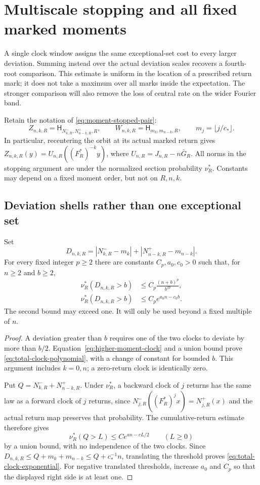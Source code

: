 \section{Multiscale stopping and all fixed marked moments}
\label{sec:multiscale-stopping}
A single clock window assigns the same exceptional-set cost to every
larger deviation. Summing instead over the actual deviation scales
recovers a fourth-root comparison. This estimate is uniform in the
location of a prescribed return mark; it does not take a maximum over
all marks inside the expectation. The stronger comparison will also
remove the loss of central rate on the wider Fourier band.

Retain the notation of \eqref{eq:moment-stopped-pair}:
\[
 Z_{n,k,R}=\mathsf H_{N^-_{k,R},N^+_{n-k,R},R},\qquad
 W_{n,k,R}=\mathsf H_{m_k,m_{n-k},R},\qquad
 m_j=\lfloor j/c_*\rfloor.
\]
In particular, recentering the orbit at its actual marked return gives
$Z_{n,k,R}(y)=U_{n,R}((F_R^*)^{-k}y)$, where
$U_{n,R}=J_{n,R}-n\bar G_R$. All norms in the stopping argument are
under the normalized section probability $\nu_R^*$. Constants may
depend on a fixed moment order, but not on $R,n,k$.

\subsection{Deviation shells rather than one exceptional set}
\begin{lemma}
\label{lem:total-clock-deviation}
Set
\[
 D_{n,k,R}=|N^-_{k,R}-m_k|+|N^+_{n-k,R}-m_{n-k}|.
\]
For every fixed integer $p\ge2$ there are constants $C_p,a_0,c_0>0$
such that, for $n\ge2$ and $b\ge2$,
\begin{align}
 \nu_R^*(D_{n,k,R}>b)&\le C_p\frac{(n+b)^p}{b^{2p}},
       \label{eq:total-clock-polynomial}\\
 \nu_R^*(D_{n,k,R}>b)&\le C_pe^{a_0n-c_0b}.
       \label{eq:total-clock-exponential}
\end{align}
The second bound may exceed one. It will only be used beyond a fixed
multiple of $n$.
\end{lemma}
\begin{proof}
A deviation greater than $b$ requires one of the two clocks to deviate
by more than $b/2$. Equation~\eqref{eq:higher-moment-clock} and a
union bound prove \eqref{eq:total-clock-polynomial}, with a change of
constant for bounded $b$. This argument includes $k=0,n$; a zero-return
clock is identically zero.

Put $Q=N^-_{k,R}+N^+_{n-k,R}$. Under $\nu_R^*$, a backward clock of
$j$ returns has the same law as a forward clock of $j$ returns, since
$N^-_{j,R}((F_R^*)^jx)=N^+_{j,R}(x)$ and the actual return map preserves
that probability. The cumulative-return estimate therefore gives
\[
 \nu_R^*(Q>L)\le C e^{an-cL/2}\qquad(L\ge0)
\]
by a union bound, with no independence of the two clocks. Since
$D_{n,k,R}\le Q+m_k+m_{n-k}\le Q+c_*^{-1}n$, translating the threshold
proves \eqref{eq:total-clock-exponential}. For negative translated
thresholds, increase $a_0$ and $C_p$ so that the displayed right side
is at least one.
\end{proof}

